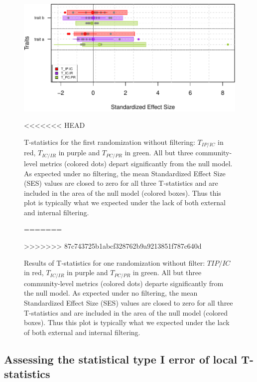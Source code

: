 \documentclass[12pt]{article}\usepackage[]{graphicx}\usepackage[]{color}
\makeatletter
\def\maxwidth{ %
  \ifdim\Gin@nat@width>\linewidth
    \linewidth
  \else
    \Gin@nat@width
  \fi
}
\newenvironment{knitrout}{}{} %
\makeatother
\begin{document}
\begin{landscape}
\begin{knitrout}
\begin{figure}
{\centering \includegraphics[width=\maxwidth]{figure/No_Filter_plots_Tstats-1} 

}

<<<<<<< HEAD
\caption[T-statistics for the first randomization without filtering]{T-statistics for the first randomization without filtering: $T_{IP/IC}$ in red, $T_{IC/IR}$ in purple and $T_{PC/PR}$ in green. All but three community-level metrics (colored dots) depart significantly from the null model. As expected under no filtering, the mean Standardized Effect Size (SES) values are closed to zero for all three T-statistics and are included in the area of the null model (colored boxes). Thus this plot is typically what we expected under the lack of both external and internal filtering.}\label{fig:No_Filter_plots_Tstats}
=======
\caption[Results of T-statistics for one randomization without filter]{Results of T-statistics for one randomization without filter: $T IP/IC$ in red, $T_{IC/IR}$ in purple and $T_{PC/PR}$ in green. All but three community-level metrics (colored dots) departe significantly from the null model. As expected under no filtering, the mean Standardized Effect Size (SES) values are closed to zero for all three T-statistics and are included in the area of the null model (colored boxes). Thus this plot is typically what we expected under the lack of both external and internal filtering.}\label{fig:No_Filter_plots_Tstats}
>>>>>>> 87c743725b1abcf328762b9a9213851f787c640d
\end{figure}


\end{knitrout}

 \subsection {Assessing the statistical type I error of local T-statistics}
 

\end{landscape}
\end{document}
